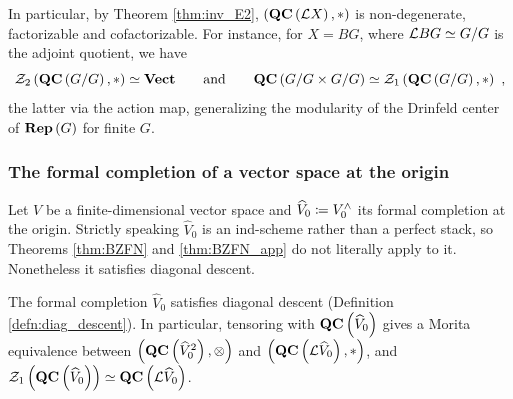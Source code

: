 In particular, by Theorem \ref{thm:inv_E2}, $\left(\mathbf{QC}\left(\mathcal{L} X\right),*\right)$ is
non-degenerate, factorizable and cofactorizable. For instance, for $X=BG$, where $\mathcal{L} BG\simeq G/G$ is the adjoint quotient, we have
\begin{equation*}
\mathcal{Z}_2\left(\mathbf{QC}\left(G/G\right),*\right)\simeq\mathbf{Vect}
\qquad\text{and}\qquad
\mathbf{QC}\left(G/G\times G/G\right)\simeq \mathcal{Z}_1\left(\mathbf{QC}\left(G/G\right),*\right) \ ,
\end{equation*}
the latter via the action map, generalizing the modularity of the Drinfeld center of
$\mathbf{Rep}\left(G\right)$ for finite $G$.

\subsubsection{The formal completion of a vector space at the origin}
\label{sec:formal_vector_space}

Let $V$ be a finite-dimensional vector space and $\widehat V_0\coloneqq V^\wedge_0$ its formal
completion at the origin. Strictly speaking $\widehat V_0$ is an ind-scheme rather than a
perfect stack, so Theorems \ref{thm:BZFN} and \ref{thm:BZFN_app} do not literally apply to
it. Nonetheless it satisfies diagonal descent.

\begin{prop}
\label{prop:Morita_formal}
The formal completion $\widehat V_0$ satisfies diagonal descent
(Definition \ref{defn:diag_descent}). In particular, tensoring with $\mathbf{QC}\left(\widehat V_0\right)$
gives a Morita equivalence between $\left(\mathbf{QC}\left(\widehat V_0^2\right),\otimes\right)$ and
$\left(\mathbf{QC}\left(\mathcal{L}\widehat V_0\right),*\right)$, and
$\mathcal{Z}_1\left(\mathbf{QC}\left(\widehat V_0\right)\right)\simeq\mathbf{QC}\left(\mathcal{L}\widehat V_0\right)$.
\end{prop}

